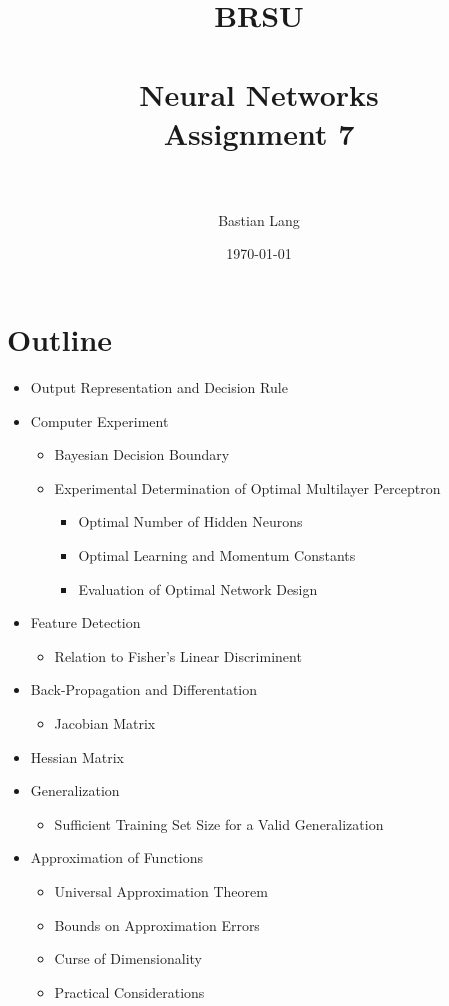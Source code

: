 \documentclass[paper=a4, fontsize=11pt]{scrartcl} %
\title{	
\normalfont \normalsize 
\textsc{BRSU} \\ [25pt] %
\horrule{0.5pt} \\[0.4cm] %
\huge Neural Networks\\Assignment 7 \\ %
\horrule{2pt} \\[0.5cm] %
}
\author{Bastian Lang} %
\date{\normalsize\today} %
\numberwithin{equation}{section} %
\numberwithin{figure}{section} %
\numberwithin{table}{section} %
\begin{document}
\maketitle %

\newpage

\section{Outline}

\begin{itemize}
	\item Output Representation and Decision Rule
	
	\item Computer Experiment
	\begin{itemize}
		\item Bayesian Decision Boundary
		\item Experimental Determination of Optimal Multilayer Perceptron
		\begin{itemize}
			\item Optimal Number of Hidden Neurons
			\item Optimal Learning and Momentum Constants
			\item Evaluation of Optimal Network Design
		\end{itemize}
	\end{itemize}
	
	\item Feature Detection
	\begin{itemize}
		\item Relation to Fisher's Linear Discriminent
	\end{itemize}
	
	\item Back-Propagation and Differentation
	\begin{itemize}
		\item Jacobian Matrix
	\end{itemize}
	
	\item Hessian Matrix
	
	\item Generalization
	\begin{itemize}
		\item Sufficient Training Set Size for a Valid Generalization
	\end{itemize}
	
	\item Approximation of Functions
	\begin{itemize}
		\item Universal Approximation Theorem
		\item Bounds on Approximation Errors
		\item Curse of Dimensionality
		\item Practical Considerations
	\end{itemize}
	

\end{itemize}
\end{document}
